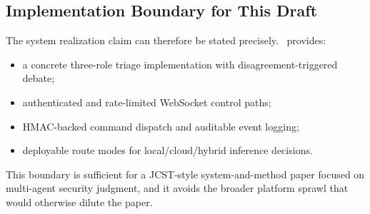 \subsection{Implementation Boundary for This Draft}

The system realization claim can therefore be stated precisely. \system\ provides:
\begin{itemize}
  \item a concrete three-role triage implementation with disagreement-triggered debate;
  \item authenticated and rate-limited WebSocket control paths;
  \item HMAC-backed command dispatch and auditable event logging;
  \item deployable route modes for local/cloud/hybrid inference decisions.
\end{itemize}
This boundary is sufficient for a JCST-style system-and-method paper focused on multi-agent security judgment, and it avoids the broader platform sprawl that would otherwise dilute the paper.
